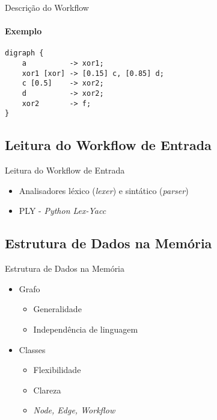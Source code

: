 \documentclass[xcolor=x11names,compress]{beamer}
\renewcommand{\(}{\begin{columns}}
\renewcommand{\)}{\end{columns}}
\newcommand{\<}[1]{\begin{column}{#1}}
\renewcommand{\>}{\end{column}}
\begin{document}
\begin{frame}[fragile]{Descrição do Workflow}
    \framesubtitle{Exemplo}
    \begin{lstlisting}
digraph {
    a          -> xor1;
    xor1 [xor] -> [0.15] c, [0.85] d;
    c [0.5]    -> xor2;
    d          -> xor2;
    xor2       -> f;
}
    \end{lstlisting}
\end{frame}

    \subsection{Leitura do Workflow de Entrada}
        \begin{frame}{Leitura do Workflow de Entrada}
            \begin{itemize}[<+->]
                \item Analisadores léxico (\emph{lexer}) e sintático (\emph{parser})
                \item PLY - \emph{Python Lex-Yacc}
            \end{itemize}
        \end{frame}

    \subsection{Estrutura de Dados na Memória}
        \begin{frame}{Estrutura de Dados na Memória}
            \begin{itemize}
                \item<1-> Grafo
                    \begin{itemize}
                        \item<1-> Generalidade
                        \item<1-> Independência de linguagem
                    \end{itemize}
                \item<2-> Classes
                    \begin{itemize}
                        \item<2-> Flexibilidade
                        \item<2-> Clareza
                        \item<3-> \emph{Node, Edge, Workflow}
                    \end{itemize}
            \end{itemize}
        \end{frame}
\end{document}
